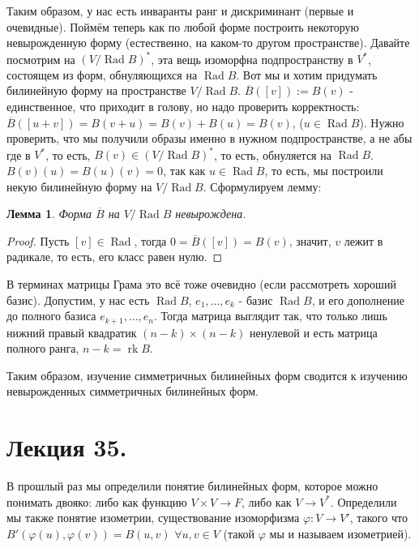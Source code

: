 \documentclass[a4paper,100pt]{article}
\theoremstyle{indented}
\newtheorem{lemma}{Лемма}
\theoremstyle{definition}
\theoremstyle{remark}
\DeclareMathOperator{\Rad}{Rad}
\DeclareMathOperator{\rk}{rk}
\begin{document}
Таким образом, у нас есть инваранты ранг и дискриминант (первые и очевидные). Поймём теперь как по любой форме построить некоторую невырожденную форму (естественно, на каком-то другом пространстве). Давайте посмотрим на $(V/\Rad B)^*$, эта вещь изоморфна подпространству в $V^*$, состоящем из форм, обнуляющихся на $\Rad B$. Вот мы и хотим придумать билинейную форму на пространстве $V/\Rad B$. $\overline{B}([v]):=B(v)$ - единственное, что приходит в голову, но надо проверить корректность: $\overline{B}([u+v])=B(v+u)=B(v)+B(u)=B(v)$, ($u \in \Rad B$). Нужно проверить, что мы получили образы именно в нужном подпространстве, а не абы где в $V^*$, то есть, $B(v)\in(V/\Rad B)^*$, то есть, обнуляется на $\Rad B$. $B(v)(u)=B(u)(v)=0$, так как $u\in \Rad B$, то есть, мы построили некую билинейную форму на $V /\Rad B$. Сформулируем лемму: \\

\begin{lemma}
    Форма $\overline{B}$ на $V/\Rad B$ невырождена.
\end{lemma}

\begin{proof}
    Пусть $[v]\in \Rad $, тогда $0=\overline{B}([v])=B(v)$, значит, $v$ лежит в радикале, то есть, его класс равен нулю.
\end{proof}

В терминах матрицы Грама это всё тоже очевидно (если рассмотреть хороший базис). Допустим, у нас есть $\Rad B$, $e_1, \ldots, e_k$ - базис $\Rad B$, и его дополнение до полного базиса $e_{k+1}, \ldots, e_n$. Тогда матрица выглядит так, что только лишь нижний правый квадратик $(n-k)\times (n-k)$ ненулевой и есть матрица полного ранга, $n-k=\rk B$. \ 

Таким образом, изучение симметричных билинейных форм сводится к изучению невырожденных симметричных билинейных форм. 

\section{Лекция 35.}

В прошлый раз мы определили понятие билинейных форм, которое можно понимать двояко: либо как функцию $V\times V \rightarrow F$, либо как $V\rightarrow V^*$. Определили мы также понятие изометрии, существование изоморфизма $\varphi: V\rightarrow V'$, такого что $B'(\varphi(u), \varphi(v))=B(u, v)$ $\forall u, v \in V$ (такой $\varphi$ мы и называем изометрией). \\
\end{document}
